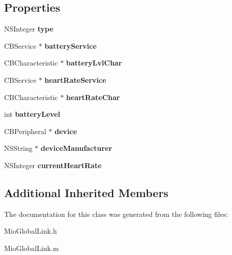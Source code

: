 \subsection*{Properties}
\begin{DoxyCompactItemize}
\item 
\hypertarget{interface_mio_global_link_a82edb3dd6e24af3fb2ed9061e2c2b21f}{N\-S\-Integer {\bfseries type}}\label{interface_mio_global_link_a82edb3dd6e24af3fb2ed9061e2c2b21f}

\item 
\hypertarget{interface_mio_global_link_a6615e890d11dfb95046f5f229f789f8e}{C\-B\-Service $\ast$ {\bfseries battery\-Service}}\label{interface_mio_global_link_a6615e890d11dfb95046f5f229f789f8e}

\item 
\hypertarget{interface_mio_global_link_a77ed04d9593004c08ec49e1620cd79a0}{C\-B\-Characteristic $\ast$ {\bfseries battery\-Lvl\-Char}}\label{interface_mio_global_link_a77ed04d9593004c08ec49e1620cd79a0}

\item 
\hypertarget{interface_mio_global_link_af59bfad40ad67f8cc419f3242f04500b}{C\-B\-Service $\ast$ {\bfseries heart\-Rate\-Service}}\label{interface_mio_global_link_af59bfad40ad67f8cc419f3242f04500b}

\item 
\hypertarget{interface_mio_global_link_a6d0625aca6d7b1638753cb5e321e9632}{C\-B\-Characteristic $\ast$ {\bfseries heart\-Rate\-Char}}\label{interface_mio_global_link_a6d0625aca6d7b1638753cb5e321e9632}

\item 
\hypertarget{interface_mio_global_link_a7f0add9d273f0d51eb4b3c73f3eb167d}{int {\bfseries battery\-Level}}\label{interface_mio_global_link_a7f0add9d273f0d51eb4b3c73f3eb167d}

\item 
\hypertarget{interface_mio_global_link_a8d4650fecd6a5f86366446e862be7f21}{C\-B\-Peripheral $\ast$ {\bfseries device}}\label{interface_mio_global_link_a8d4650fecd6a5f86366446e862be7f21}

\item 
\hypertarget{interface_mio_global_link_a5d67ddaf6d5941b85f93196a95630b9d}{N\-S\-String $\ast$ {\bfseries device\-Manufacturer}}\label{interface_mio_global_link_a5d67ddaf6d5941b85f93196a95630b9d}

\item 
\hypertarget{interface_mio_global_link_acb64fafbafbb75c3e6f2c382841f9f06}{N\-S\-Integer {\bfseries current\-Heart\-Rate}}\label{interface_mio_global_link_acb64fafbafbb75c3e6f2c382841f9f06}

\end{DoxyCompactItemize}
\subsection*{Additional Inherited Members}


The documentation for this class was generated from the following files\-:\begin{DoxyCompactItemize}
\item 
Mio\-Global\-Link.\-h\item 
Mio\-Global\-Link.\-m\end{DoxyCompactItemize}
